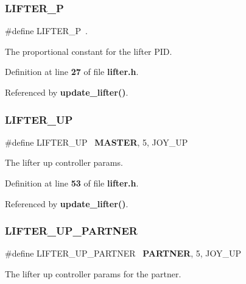 \subsubsection{L\+I\+F\+T\+E\+R\+\_\+P}
{\footnotesize\ttfamily \#define L\+I\+F\+T\+E\+R\+\_\+P~.}



The proportional constant for the lifter P\+ID. 



Definition at line \textbf{ 27} of file \textbf{ lifter.\+h}.



Referenced by \textbf{ update\+\_\+lifter()}.

\mbox{\label{lifter_8h_a96a5c0bbb7527bf1d45818fc4db97b68}} 
\subsubsection{L\+I\+F\+T\+E\+R\+\_\+\+UP}
{\footnotesize\ttfamily \#define L\+I\+F\+T\+E\+R\+\_\+\+UP~\textbf{ M\+A\+S\+T\+ER}, 5, J\+O\+Y\+\_\+\+UP}



The lifter up controller params. 



Definition at line \textbf{ 53} of file \textbf{ lifter.\+h}.



Referenced by \textbf{ update\+\_\+lifter()}.

\mbox{\label{lifter_8h_adbb0a4048f612d2042be2b1d2644a16e}} 
\subsubsection{L\+I\+F\+T\+E\+R\+\_\+\+U\+P\+\_\+\+P\+A\+R\+T\+N\+ER}
{\footnotesize\ttfamily \#define L\+I\+F\+T\+E\+R\+\_\+\+U\+P\+\_\+\+P\+A\+R\+T\+N\+ER~\textbf{ P\+A\+R\+T\+N\+ER}, 5, J\+O\+Y\+\_\+\+UP}



The lifter up controller params for the partner. 



